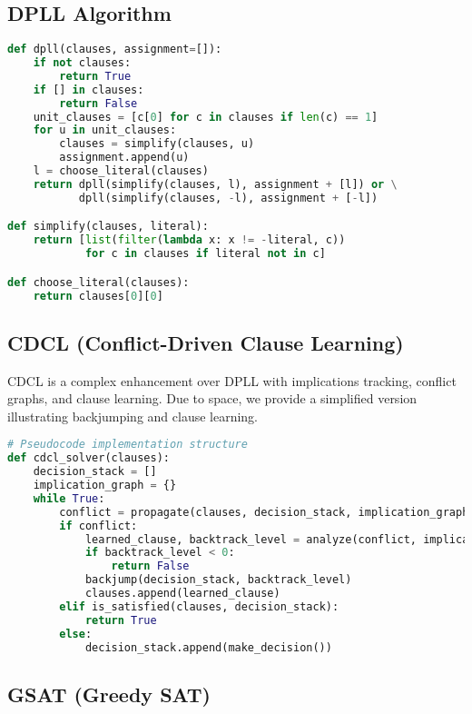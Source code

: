 \documentclass[11pt]{article}
\begin{document}
\subsection*{DPLL Algorithm}

\begin{lstlisting}[language=Python, caption=DPLL Algorithm]
def dpll(clauses, assignment=[]):
    if not clauses:
        return True
    if [] in clauses:
        return False
    unit_clauses = [c[0] for c in clauses if len(c) == 1]
    for u in unit_clauses:
        clauses = simplify(clauses, u)
        assignment.append(u)
    l = choose_literal(clauses)
    return dpll(simplify(clauses, l), assignment + [l]) or \
           dpll(simplify(clauses, -l), assignment + [-l])

def simplify(clauses, literal):
    return [list(filter(lambda x: x != -literal, c))
            for c in clauses if literal not in c]

def choose_literal(clauses):
    return clauses[0][0]
\end{lstlisting}

\subsection*{CDCL (Conflict-Driven Clause Learning)}

CDCL is a complex enhancement over DPLL with implications tracking, conflict graphs, and clause learning. Due to space, we provide a simplified version illustrating backjumping and clause learning.

\begin{lstlisting}[language=Python, caption=CDCL Core Concepts (simplified)]
# Pseudocode implementation structure
def cdcl_solver(clauses):
    decision_stack = []
    implication_graph = {}
    while True:
        conflict = propagate(clauses, decision_stack, implication_graph)
        if conflict:
            learned_clause, backtrack_level = analyze(conflict, implication_graph)
            if backtrack_level < 0:
                return False
            backjump(decision_stack, backtrack_level)
            clauses.append(learned_clause)
        elif is_satisfied(clauses, decision_stack):
            return True
        else:
            decision_stack.append(make_decision())
\end{lstlisting}

\subsection*{GSAT (Greedy SAT)}
\end{document}
